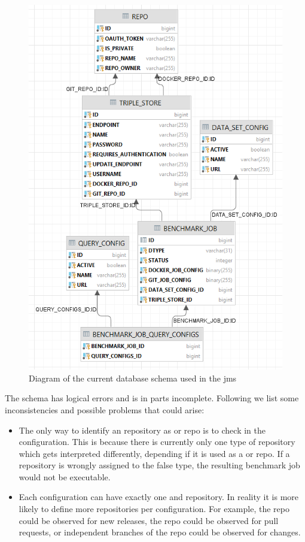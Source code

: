 \begin{figure}[tbph]
	\centering
	\includegraphics[width=.7\textwidth]{figures/jms_db_schema.png}
	\caption{Diagram of the current database schema used in the \ac{jms}}
	\label{fig:jms_db_schema}
\end{figure}

The schema has logical errors and is in parts incomplete.
Following we list some inconsistencies and possible problems that could arise:
\begin{itemize}
	\item The only way to identify an repository as \gh{} or \dockh{} repo is to check in the \ts{} configuration.
		This is because there is currently only one type of repository which gets interpreted differently, depending if it is used as a \gh{} or \dockh{} repo.
		If a repository is wrongly assigned to the false type, the resulting benchmark job would not be executable. 
	
	\item Each \ts{} configuration can have exactly one \gh{} and \dockh{} repository.
		In reality it is more likely to define more repositories per \ts{} configuration.
		For example, the \gh{} repo could be observed for new releases, the \gh{} repo could be observed for pull requests, or independent branches of the \gh{} repo could be observed for changes.
\end{itemize} 

